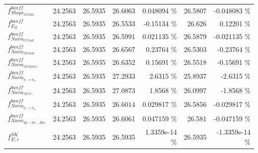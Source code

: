 \begin{table}
\begin{tabular}{| l | r | r | r  r | r  r |}
                                                     $f_{Shape_{CCoth}}^{banff}$ &         24.2563 & 26.5935 & 26.6063 &        0.048094 \%  &         26.5807 &       -0.048083 \%  \\ 
                                                             $f_{E_{B}}^{banff}$ &         24.2563 & 26.5935 & 26.5533 &        -0.15134 \%  &          26.626 &         0.12201 \%  \\ 
                                                      $f_{Norm_{CCcoh}}^{banff}$ &         24.2563 & 26.5935 & 26.5991 &        0.021135 \%  &         26.5879 &       -0.021135 \%  \\ 
                                                      $f_{Norm_{NCcoh}}^{banff}$ &         24.2563 & 26.5935 & 26.6567 &         0.23764 \%  &         26.5303 &        -0.23764 \%  \\ 
                                                    $f_{Norm_{NCother}}^{banff}$ &         24.2563 & 26.5935 & 26.6352 &         0.15691 \%  &         26.5518 &        -0.15691 \%  \\ 
                                  $f_{Norm_{\nu_e \rightarrow \nu_\mu}}^{banff}$ &         24.2563 & 26.5935 & 27.2933 &          2.6315 \%  &         25.8937 &         -2.6315 \%  \\ 
                                                  $f_{Norm_{NC1\gamma}}^{banff}$ &         24.2563 & 26.5935 & 27.0873 &          1.8568 \%  &         26.0997 &         -1.8568 \%  \\ 
                      $f_{Norm_{\bar{\nu}_e \rightarrow \bar{\nu}_\mu}}^{banff}$ &         24.2563 & 26.5935 & 26.6014 &        0.029817 \%  &         26.5856 &       -0.029817 \%  \\ 
                                                     $f_{Norm_{2p-2h-Bar}}^{banff}$ &         24.2563 & 26.5935 & 26.6061 &        0.047159 \%  &          26.581 &       -0.047159 \%  \\ 
                                                                 $f_{E; r}^{SK}$ &         24.2563 & 26.5935 & 26.5935 &      1.3359e-14 \%  &         26.5935 &     -1.3359e-14 \%  \\ 

\end{tabular}
\end{table}
